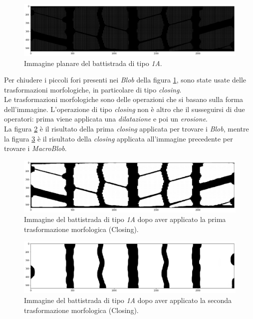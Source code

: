 \begin{figure}[H]
	\centering
	\includegraphics[width=0.9\columnwidth]{./pictures/batt_1a_analisi_6.png}
	\caption{Immagine planare del battistrada di tipo \textit{1A}.}\label{fig:batt_1a_analisi_6}
\end{figure}

\noindent Per chiudere i piccoli fori presenti nei \textit{Blob} della figura \ref{fig:batt_1a_analisi_6}, sono state usate delle trasformazioni morfologiche, in particolare di tipo \textit{closing}.\\
\newline
Le trasformazioni morfologiche sono delle operazioni che si basano sulla forma dell'immagine. L'operazione di tipo \textit{closing} non è altro che il susseguirsi di due operatori: prima viene applicata una \textit{dilatazione} e poi un \textit{erosione}.\\
La figura \ref{fig:batt_1a_analisi_7} è il risultato della prima \textit{closing} applicata per trovare i \textit{Blob}, mentre la figura \ref{fig:batt_1a_analisi_8} è il risultato della \textit{closing} applicata all'immagine precedente per trovare i \textit{MacroBlob}.\\

\begin{figure}[H]
	\centering
	\includegraphics[width=0.9\columnwidth]{./pictures/batt_1a_analisi_7.png}
	\caption{Immagine del battistrada di tipo \textit{1A} dopo aver applicato la prima trasformazione morfologica (Closing).}\label{fig:batt_1a_analisi_7}
\end{figure}

\begin{figure}[H]
	\centering
	\includegraphics[width=0.9\columnwidth]{./pictures/batt_1a_analisi_8.png}
	\caption{Immagine del battistrada di tipo \textit{1A} dopo aver applicato la seconda trasformazione morfologica (Closing).}\label{fig:batt_1a_analisi_8}
\end{figure}

